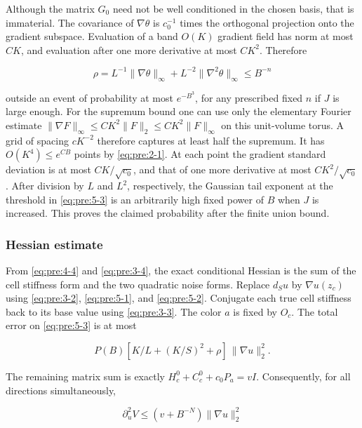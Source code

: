 Although the matrix \(G_0\) need not be well conditioned in the chosen basis, that is immaterial. The covariance of \(\nabla\theta\) is \(c_0^{-1}\) times the orthogonal projection onto the gradient subspace. Evaluation of a band \(O(K)\) gradient field has norm at most \(CK\), and evaluation after one more derivative at most \(CK^2\). Therefore

\begin{equation}
\rho=L^{-1}\|\nabla\theta\|_\infty+L^{-2}\|\nabla^2\theta\|_\infty
\leq B^{-n}
\label{eq:pre:5-3}
\end{equation}

outside an event of probability at most \(e^{-B^3}\), for any prescribed fixed \(n\) if \(J\) is large enough. For the supremum bound one can use only the elementary Fourier estimate
\(\|\nabla F\|_\infty\leq CK^2\|F\|_2\leq CK^2\|F\|_\infty\)
on this unit-volume torus. A grid of spacing \(cK^{-2}\) therefore captures
at least half the supremum. It has \(O(K^4)\leq e^{CB}\) points by
\eqref{eq:pre:2-1}. At each point the gradient standard deviation is at most
\(CK/\sqrt{c_0}\), and that of one more derivative at most
\(CK^2/\sqrt{c_0}\). After division by \(L\) and \(L^2\), respectively,
the Gaussian tail exponent at the threshold in \eqref{eq:pre:5-3} is an
arbitrarily high fixed power of \(B\) when \(J\) is increased. This proves
the claimed probability after the finite union bound.

\subsubsection{Hessian estimate}\label{pre:part-5-2}

From \eqref{eq:pre:4-4} and \eqref{eq:pre:3-4}, the exact conditional Hessian is the sum of the cell stiffness form and the two quadratic noise forms. Replace \(d_Su\) by \(\nabla u(z_c)\) using \eqref{eq:pre:3-2}, \eqref{eq:pre:5-1}, and \eqref{eq:pre:5-2}. Conjugate each true cell stiffness back to its base value using \eqref{eq:pre:3-3}. The color \(a\) is fixed by \(O_c\). The total error on \eqref{eq:pre:5-3} is at most

\[
P(B)[K/L+(K/S)^2+\rho]\,\|\nabla u\|_2^2.
\]

The remaining matrix sum is exactly \(H_c^0+C_c^0+c_0P_a=vI\). Consequently, for all directions simultaneously,

\begin{equation}
\partial_u^2V\leq(v+B^{-N})\|\nabla u\|_2^2
\label{eq:pre:5-4}
\end{equation}

